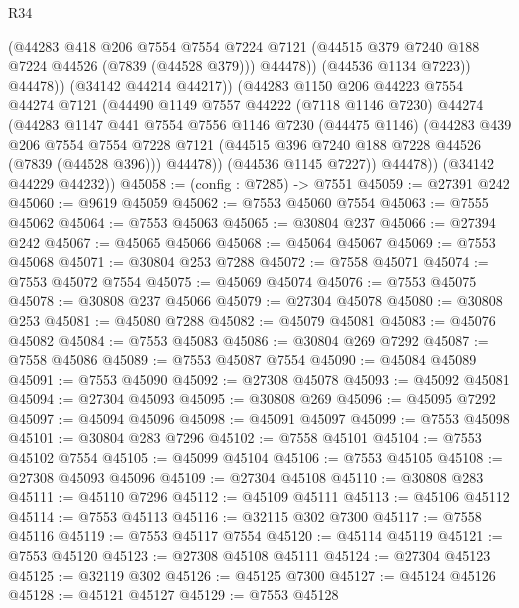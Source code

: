\begin{lexlean}{R34}
\begin{coremodule}
                  (@44283
                    @418
                    @206
                    @7554
                    @7554
                    @7224
                    @7121
                    (@44515 @379 @7240 @188 @7224 @44526 (@7839 (@44528 @379)))
                    @44478))
                (@44536 @1134 @7223))
              @44478))
          (@34142 @44214 @44217))
        (@44283
          @1150
          @206
          @44223
          @7554
          @44274
          @7121
          (@44490
            @1149
            @7557
            @44222
            (@7118 @1146 @7230)
            @44274
            (@44283
              @1147
              @441
              @7554
              @7556
              @1146
              @7230
              (@44475 @1146)
              (@44283
                @439
                @206
                @7554
                @7554
                @7228
                @7121
                (@44515 @396 @7240 @188 @7228 @44526 (@7839 (@44528 @396)))
                @44478))
            (@44536 @1145 @7227))
          @44478))
      (@34142 @44229 @44232))
@45058 := (config : @7285) -> @7551
@45059 := @27391 @242
@45060 := @9619 @45059
@45062 := @7553 @45060 @7554
@45063 := @7555 @45062
@45064 := @7553 @45063
@45065 := @30804 @237
@45066 := @27394 @242
@45067 := @45065 @45066
@45068 := @45064 @45067
@45069 := @7553 @45068
@45071 := @30804 @253 @7288
@45072 := @7558 @45071
@45074 := @7553 @45072 @7554
@45075 := @45069 @45074
@45076 := @7553 @45075
@45078 := @30808 @237 @45066
@45079 := @27304 @45078
@45080 := @30808 @253
@45081 := @45080 @7288
@45082 := @45079 @45081
@45083 := @45076 @45082
@45084 := @7553 @45083
@45086 := @30804 @269 @7292
@45087 := @7558 @45086
@45089 := @7553 @45087 @7554
@45090 := @45084 @45089
@45091 := @7553 @45090
@45092 := @27308 @45078
@45093 := @45092 @45081
@45094 := @27304 @45093
@45095 := @30808 @269
@45096 := @45095 @7292
@45097 := @45094 @45096
@45098 := @45091 @45097
@45099 := @7553 @45098
@45101 := @30804 @283 @7296
@45102 := @7558 @45101
@45104 := @7553 @45102 @7554
@45105 := @45099 @45104
@45106 := @7553 @45105
@45108 := @27308 @45093 @45096
@45109 := @27304 @45108
@45110 := @30808 @283
@45111 := @45110 @7296
@45112 := @45109 @45111
@45113 := @45106 @45112
@45114 := @7553 @45113
@45116 := @32115 @302 @7300
@45117 := @7558 @45116
@45119 := @7553 @45117 @7554
@45120 := @45114 @45119
@45121 := @7553 @45120
@45123 := @27308 @45108 @45111
@45124 := @27304 @45123
@45125 := @32119 @302
@45126 := @45125 @7300
@45127 := @45124 @45126
@45128 := @45121 @45127
@45129 := @7553 @45128

\end{coremodule}
\end{lexlean}
